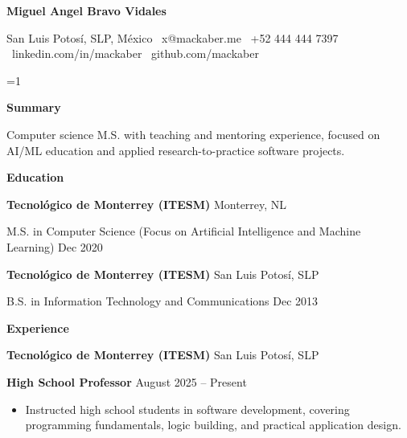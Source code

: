 \documentclass[11pt]{article}
\providecommand{\IncludeSummary}{1}
\newcommand{\ProfileSummary}{AI engineer with full-stack delivery experience, building and shipping production systems with Python, Ruby on Rails, React, and cloud platforms.}
\renewcommand{\ProfileSummary}{Computer science M.S. with teaching and mentoring experience, focused on AI/ML education and applied research-to-practice software projects.}
\begin{document}
\begin{center}
    \textbf{\LARGE Miguel Angel Bravo Vidales}\\ 
    \vspace{4pt}
    \hrulefill
\end{center}

\begin{center}
    San Luis Potosí, SLP, México \textbullet \ x@mackaber.me \textbullet \ +52 444 444 7397 \textbullet \ linkedin.com/in/mackaber \textbullet \ github.com/mackaber
\end{center}

\ifnum\IncludeSummary=1
\vspace{6pt}
\begin{center}
    \textbf{Summary}
\end{center}
\ProfileSummary
\fi

\vspace{0.5pt}

\begin{center}
    \textbf{Education}
\end{center}
\textbf{Tecnológico de Monterrey (ITESM)} \hfill Monterrey, NL

M.S. in Computer Science (Focus on Artificial Intelligence and Machine Learning) \hfill Dec 2020

\vspace{10pt}

\textbf{Tecnológico de Monterrey (ITESM)} \hfill	San Luis Potosí, SLP

B.S. in Information Technology and Communications \hfill Dec 2013

\vspace{12pt}

\begin{center}
    \textbf{Experience}
\end{center}

\textbf{Tecnológico de Monterrey (ITESM)} \hfill San Luis Potosí, SLP

\textbf{High School Professor} \hfill August 2025 – Present
\begin{itemize}[noitemsep, topsep=0pt, partopsep=0pt, parsep=0pt]
    \item Instructed high school students in software development, covering programming fundamentals, logic building, and practical application design.
\end{itemize}

\vspace{8pt}
\end{document}
